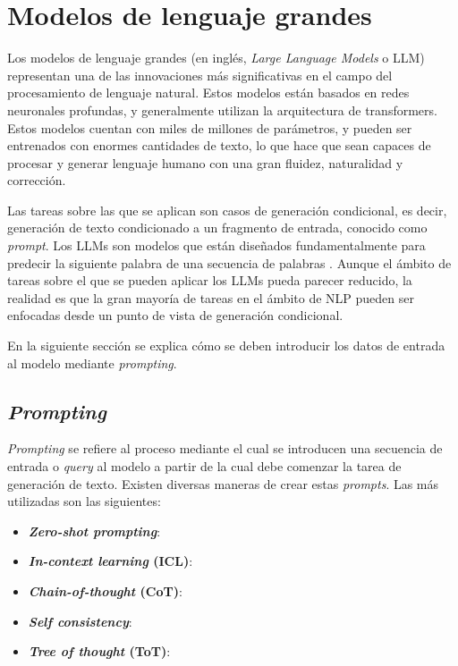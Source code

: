 \documentclass[11pt,spanish,listoffigures,listoftables]{tfgetsinf}
\begin{document}
\section{Modelos de lenguaje grandes} \label{modelosLenguajeGrandes}

Los modelos de lenguaje grandes (en inglés, \textit{Large Language Models} o LLM) representan una de las innovaciones más significativas en el campo del procesamiento de lenguaje natural. Estos modelos están basados en redes neuronales profundas, y generalmente utilizan la arquitectura de transformers. Estos modelos cuentan con miles de millones de parámetros, y pueden ser entrenados con enormes cantidades de texto, lo que hace que sean capaces de procesar y generar lenguaje humano con una gran fluidez, naturalidad y corrección.

Las tareas sobre las que se aplican son casos de generación condicional, es decir, generación de texto condicionado a un fragmento de entrada, conocido como \textit{prompt}. Los LLMs son modelos que están diseñados fundamentalmente para predecir la siguiente palabra de una secuencia de palabras \cite{jurafsky2023speech}. Aunque el ámbito de tareas sobre el que se pueden aplicar los LLMs pueda parecer reducido, la realidad es que la gran mayoría de tareas en el ámbito de NLP pueden ser enfocadas desde un punto de vista de generación condicional.

En la siguiente sección se explica cómo se deben introducir los datos de entrada al modelo mediante \textit{prompting}.

\subsection{\textit{Prompting}}

\textit{Prompting} se refiere al proceso mediante el cual se introducen una secuencia de entrada o \textit{query} al modelo a partir de la cual debe comenzar la tarea de generación de texto. Existen diversas maneras de crear estas \textit{prompts}. Las más utilizadas son las siguientes:

\begin{itemize}
	\item \textbf{\textit{Zero-shot prompting}}:
	\item \textbf{\textit{In-context learning }(ICL)}:
	\item \textbf{\textit{Chain-of-thought} (CoT)}:
	\item \textbf{\textit{Self consistency}}:
	\item \textbf{\textit{Tree of thought} (ToT)}:
\end{itemize}
\end{document}
